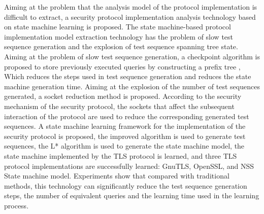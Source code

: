 \begin{eabstract}
Aiming at the problem that the analysis model of the protocol implementation is difficult to extract, a security protocol implementation analysis technology based on state machine learning is proposed. The state machine-based protocol implementation model extraction technology has the problem of slow test sequence generation and the explosion of test sequence spanning tree state. Aiming at the problem of slow test sequence generation, a checkpoint algorithm is proposed to store previously executed queries by constructing a prefix tree , Which reduces the steps used in test sequence generation and reduces the state machine generation time. Aiming at the explosion of the number of test sequences generated, a socket reduction method is proposed. According to the security mechanism of the security protocol, the sockets that affect the subsequent interaction of the protocol are used to reduce the corresponding generated test sequences. A state machine learning framework for the implementation of the security protocol is proposed, the improved algorithm is used to generate test sequences, the L* algorithm is used to generate the state machine model, the state machine implemented by the TLS protocol is learned, and three TLS protocol implementations are successfully learned: GnuTLS, OpenSSL, and NSS State machine model. Experiments show that compared with traditional methods, this technology can significantly reduce the test sequence generation steps, the number of equivalent queries and the learning time used in the learning process.


\end{eabstract}
